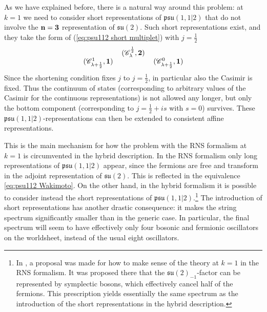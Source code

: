 \documentclass[12pt,a4paper]{article}
\newcommand{\be}{\begin{equation}}
\newcommand{\ee}{\end{equation}}
\begin{document}
As we have explained before, there is a natural way around this problem: at $k=1$ we need to consider short representations of $\mathfrak{psu}(1,1|2)$ that do not involve the ${\bf n}={\bf 3}$ representation of $\mathfrak{su}(2)$. Such short representations exist, and they take the form of (\ref{eq:psu112 short multiplet}) with $j=\frac{1}{2}$ 
\be \label{shortrep}
\begin{tabular}{ccc}
& $(\mathscr{C}^{\frac{1}{2}}_\lambda,\mathbf{2})$ & \\
$(\mathscr{C}^{1}_{\lambda+\frac{1}{2}},\mathbf{1})$ & & $(\mathscr{C}^{0}_{\lambda+\frac{1}{2}},\mathbf{1})$
\end{tabular} 
\ee
Since the shortening condition fixes $j$ to $j=\frac{1}{2}$, in particular also the Casimir is fixed. Thus the continuum of states (corresponding to arbitrary values of the Casimir for the continuous representations) is not allowed any longer, but only the bottom component (corresponding to $j=\frac{1}{2} + is$ with $s=0$) survives.  These $\mathfrak{psu}(1,1|2)$-representations can then be extended to consistent affine representations.

This is the main mechanism for how the problem with the RNS formalism at $k=1$ is circumvented in the hybrid description. In the RNS formalism only long representations of $\mathfrak{psu}(1,1|2)$ appear, since the fermions are free and transform in the adjoint representation of $\mathfrak{su}(2)$. This is reflected in the equivalence \eqref{eq:psu112 Wakimoto}. On the other hand, in the hybrid formalism it is possible to consider instead the short representations of $\mathfrak{psu}(1,1|2)$.\footnote{In \cite{Gaberdiel:2018rqv}, a proposal was made for how to make sense of the theory at $k=1$ in the RNS formalism. It was proposed there that the $\mathfrak{su}(2)_{-1}$-factor can be represented by symplectic bosons, which effectively cancel half of the fermions. This prescription yields essentially the same spectrum as the introduction of the short representations in the hybrid description.} 
The introduction of short representations has another drastic consequence: it makes the string spectrum significantly smaller than in the generic case. In particular, the final spectrum will seem to have effectively only four bosonic and fermionic oscillators on the worldsheet, instead of the usual eight oscillators.
\smallskip
\end{document}

